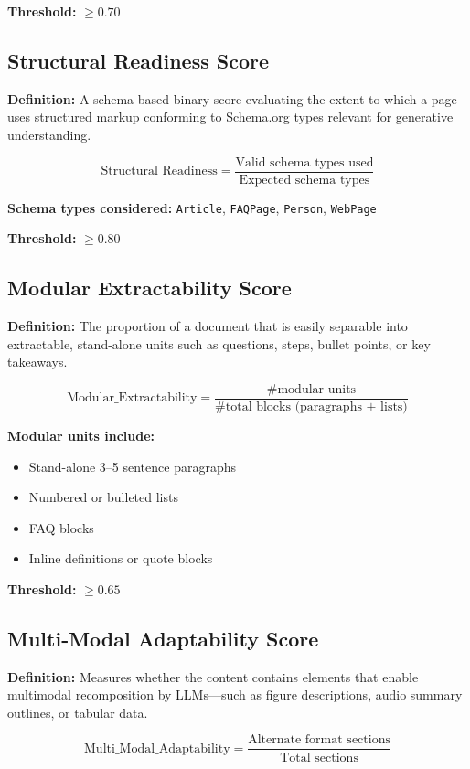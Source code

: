 \textbf{Threshold:} $\geq 0.70$

\subsection{Structural Readiness Score}

\textbf{Definition:} A schema-based binary score evaluating the extent to which a page uses structured markup conforming to Schema.org types relevant for generative understanding.

\[
\text{Structural\_Readiness} = \frac{\text{Valid schema types used}}{\text{Expected schema types}}
\]

\textbf{Schema types considered:} \texttt{Article}, \texttt{FAQPage}, \texttt{Person}, \texttt{WebPage}

\textbf{Threshold:} $\geq 0.80$

\subsection{Modular Extractability Score}

\textbf{Definition:} The proportion of a document that is easily separable into extractable, stand-alone units such as questions, steps, bullet points, or key takeaways.

\[
\text{Modular\_Extractability} = \frac{\text{\# modular units}}{\text{\# total blocks (paragraphs + lists)}}
\]

\textbf{Modular units include:}
\begin{itemize}
  \item Stand-alone 3--5 sentence paragraphs
  \item Numbered or bulleted lists
  \item FAQ blocks
  \item Inline definitions or quote blocks
\end{itemize}

\textbf{Threshold:} $\geq 0.65$

\subsection{Multi-Modal Adaptability Score}

\textbf{Definition:} Measures whether the content contains elements that enable multimodal recomposition by LLMs—such as figure descriptions, audio summary outlines, or tabular data.

\[
\text{Multi\_Modal\_Adaptability} = \frac{\text{Alternate format sections}}{\text{Total sections}}
\]

